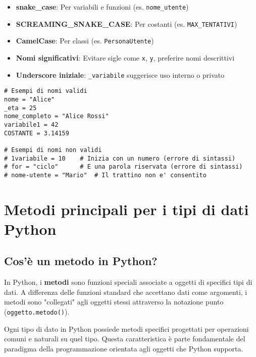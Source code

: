 \begin{tcolorbox}[colback=green!5!white,colframe=green!75!black,title=Convenzioni di stile (PEP 8)]
\begin{itemize}[leftmargin=*,itemsep=0.5em]
    \item \textbf{snake\_case}: Per variabili e funzioni (es. \texttt{nome\_utente})
    \item \textbf{SCREAMING\_SNAKE\_CASE}: Per costanti (es. \texttt{MAX\_TENTATIVI})
    \item \textbf{CamelCase}: Per classi (es. \texttt{PersonaUtente})
    \item \textbf{Nomi significativi}: Evitare sigle come \texttt{x}, \texttt{y}, preferire nomi descrittivi
    \item \textbf{Underscore iniziale}: \texttt{\_variabile} suggerisce uso interno o privato
\end{itemize}
\end{tcolorbox}

\begin{lstlisting}
# Esempi di nomi validi
nome = "Alice"
_eta = 25
nome_completo = "Alice Rossi"
variabile1 = 42
COSTANTE = 3.14159

# Esempi di nomi non validi
# 1variabile = 10    # Inizia con un numero (errore di sintassi)
# for = "ciclo"      # E una parola riservata (errore di sintassi)
# nome-utente = "Mario"  # Il trattino non e' consentito
\end{lstlisting}

\vspace{0.5cm}


\clearpage
\section{Metodi principali per i tipi di dati Python}

\subsection*{Cos'è un metodo in Python?}

In Python, i \textbf{metodi} sono funzioni speciali associate a oggetti di specifici tipi di dati. A differenza delle funzioni standard che accettano dati come argomenti, i metodi sono "collegati" agli oggetti stessi attraverso la notazione punto (\texttt{oggetto.metodo()}).

Ogni tipo di dato in Python possiede metodi specifici progettati per operazioni comuni e naturali su quel tipo. Questa caratteristica è parte fondamentale del paradigma della programmazione orientata agli oggetti che Python supporta.


